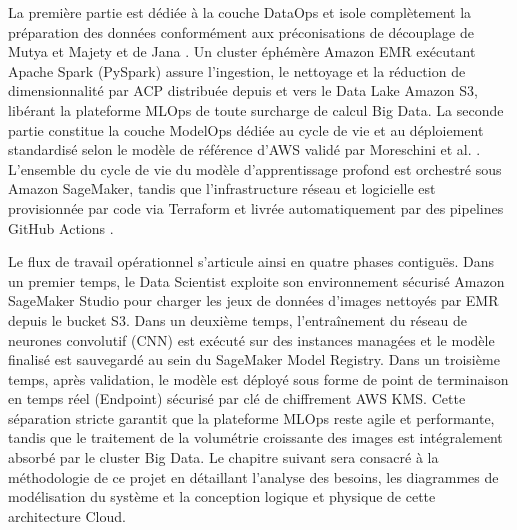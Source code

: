 La première partie est dédiée à la couche DataOps et isole complètement la préparation des données conformément aux préconisations de découplage de Mutya et Majety \cite{89} et de Jana \cite{94}. Un cluster éphémère Amazon EMR exécutant Apache Spark (PySpark) assure l'ingestion, le nettoyage et la réduction de dimensionnalité par ACP distribuée depuis et vers le Data Lake Amazon S3, libérant la plateforme MLOps de toute surcharge de calcul Big Data. La seconde partie constitue la couche ModelOps dédiée au cycle de vie et au déploiement standardisé selon le modèle de référence d'AWS validé par Moreschini et al. \cite{93}. L'ensemble du cycle de vie du modèle d'apprentissage profond est orchestré sous Amazon SageMaker, tandis que l'infrastructure réseau et logicielle est provisionnée par code via Terraform et livrée automatiquement par des pipelines GitHub Actions \cite{92}.

Le flux de travail opérationnel s'articule ainsi en quatre phases contiguës. Dans un premier temps, le Data Scientist exploite son environnement sécurisé Amazon SageMaker Studio pour charger les jeux de données d'images nettoyés par EMR depuis le bucket S3. Dans un deuxième temps, l'entraînement du réseau de neurones convolutif (CNN) est exécuté sur des instances managées et le modèle finalisé est sauvegardé au sein du SageMaker Model Registry. Dans un troisième temps, après validation, le modèle est déployé sous forme de point de terminaison en temps réel (Endpoint) sécurisé par clé de chiffrement AWS KMS. Cette séparation stricte garantit que la plateforme MLOps reste agile et performante, tandis que le traitement de la volumétrie croissante des images est intégralement absorbé par le cluster Big Data. Le chapitre suivant sera consacré à la méthodologie de ce projet en détaillant l'analyse des besoins, les diagrammes de modélisation du système et la conception logique et physique de cette architecture Cloud.